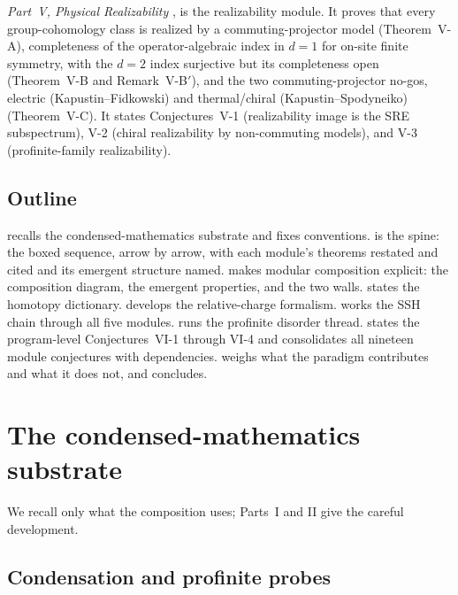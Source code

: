 \documentclass[12pt]{article}
\theoremstyle{plain}
\theoremstyle{definition}
\theoremstyle{remark}
\begin{document}
\emph{Part~V, Physical Realizability} \cite{paperRealizability}, is the realizability
module. It proves that every group-cohomology class is realized by a commuting-projector
model (Theorem~V-A), completeness of the operator-algebraic index in $d=1$ for on-site
finite symmetry, with the $d=2$ index surjective but its completeness open
(Theorem~V-B and Remark~V-B$'$), and the two commuting-projector no-gos, electric
(Kapustin--Fidkowski) and thermal/chiral (Kapustin--Spodyneiko) (Theorem~V-C)\@. It states
Conjectures~V-1 (realizability image is the SRE subspectrum),
V-2 (chiral realizability by non-commuting models), and V-3 (profinite-family
realizability).

\subsection{Outline}
\label{sec:outline}

 recalls the condensed-mathematics substrate and fixes conventions.
 is the spine: the boxed sequence, arrow by arrow, with each module's
theorems restated and cited and its emergent structure named.
 makes modular composition explicit: the composition diagram, the
emergent properties, and the two walls.  states the homotopy
dictionary.  develops the relative-charge formalism.
 works the SSH chain through all five modules.
 runs the profinite disorder thread.  states
the program-level Conjectures~VI-1 through VI-4 and consolidates all nineteen module
conjectures with dependencies.  weighs what the paradigm
contributes and what it does not, and  concludes.

\section{The condensed-mathematics substrate}
\label{sec:substrate}

We recall only what the composition uses; Parts~I and II give the careful development.

\subsection{Condensation and profinite probes}
\end{document}
